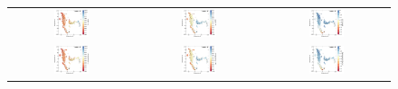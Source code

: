\documentclass{aa}
\begin{document}
\begin{appendix}
\begin{figure}[htbp]
    \centering
    \begin{tabular}{ccc}
        \includegraphics[width=0.3\textwidth]{Plots/tsne_params/tsne_R2_Teff_GES.pdf} & \includegraphics[width=0.3\textwidth]{Plots/tsne_params/tsne_R2_logg_GES.pdf} & \includegraphics[width=0.3\textwidth]{Plots/tsne_params/tsne_R2_FeH_GES.pdf} \\
        \includegraphics[width=0.3\textwidth]{Plots/tsne_params/tsne_R2_Teff_GaiaXGBoost.pdf} & \includegraphics[width=0.3\textwidth]{Plots/tsne_params/tsne_R2_logg_GaiaXGBoost.pdf} & \includegraphics[width=0.3\textwidth]{Plots/tsne_params/tsne_R2_FeH_GaiaXGBoost.pdf} \\

\end{tabular}
\end{figure}
\end{appendix}
\end{document}
